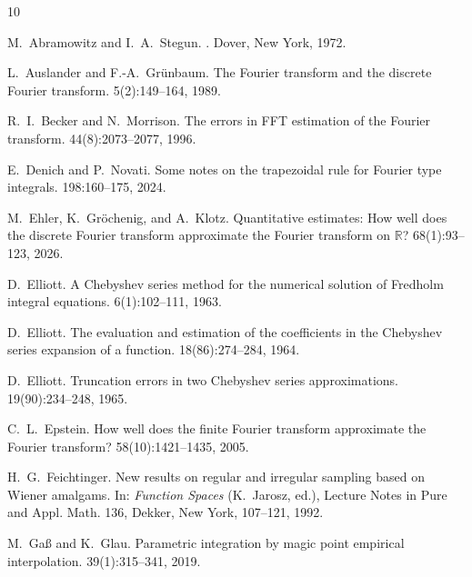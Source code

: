 \documentclass[11pt,a4paper]{scrartcl}
\numberwithin{equation}{section}
\numberwithin{table}{section}
\numberwithin{figure}{section}
\begin{document}
\footnotesize
\begin{thebibliography}{10}
\setlength{\itemsep}{0pt}\setlength{\parsep}{0pt}\setlength{\parskip}{0pt}\setlength{\topsep}{2pt}
\frenchspacing

M.~Abramowitz and I.~A.~Stegun.
.
\newblock Dover, New York, 1972.

L.~Auslander and F.-A.~Gr\"unbaum.
\newblock The Fourier transform and the discrete Fourier transform.
 5(2):149--164, 1989.

R.~I.~Becker and N.~Morrison.
\newblock The errors in FFT estimation of the Fourier transform.
 44(8):2073--2077, 1996.

E.~Denich and P.~Novati.
\newblock Some notes on the trapezoidal rule for Fourier type integrals.
 198:160--175, 2024.

M.~Ehler, K.~Gr\"{o}chenig, and A.~Klotz.
\newblock Quantitative estimates: How well does the discrete Fourier transform approximate the Fourier transform on $\mathbb R$?
 68(1):93--123, 2026.

D.~Elliott.
\newblock A Chebyshev series method for the numerical solution of Fredholm integral equations.
 6(1):102--111, 1963.

D.~Elliott.
\newblock The evaluation and estimation of the coefficients in the Chebyshev series expansion of a function.
 18(86):274--284, 1964.

D.~Elliott.
\newblock Truncation errors in two Chebyshev series approximations.
 19(90):234--248, 1965.

C.~L.~Epstein.
\newblock How well does the finite Fourier transform approximate the Fourier transform?
 58(10):1421--1435, 2005.

H.~G.~Feichtinger.
\newblock New results on regular and irregular sampling based on Wiener amalgams.
\newblock In: {\em Function Spaces} (K.~Jarosz, ed.), Lecture Notes in Pure and Appl. Math. 136, Dekker, New York, 107--121, 1992.

M.~Ga\ss{} and K.~Glau.
\newblock Parametric integration by magic point empirical interpolation.
 39(1):315--341, 2019.


\end{thebibliography}
\end{document}
